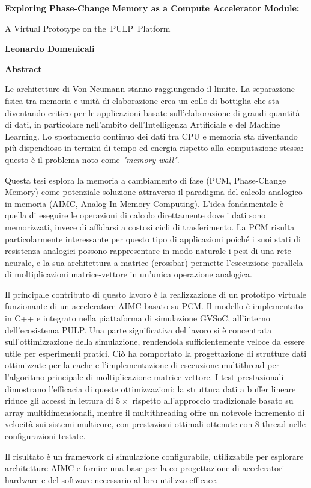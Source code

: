 \thispagestyle{plain}
\begin{center}
    \Large
    \textbf{Exploring Phase-Change Memory as a Compute Accelerator Module:}
        
    \vspace{0.4cm}
    \large
    A Virtual Prototype on the PULP Platform
        
    \vspace{0.4cm}
    \textbf{Leonardo Domenicali}
       
    \vspace{0.9cm}
    \textbf{Abstract}
\end{center}

Le architetture di Von Neumann stanno raggiungendo il limite.
La separazione fisica tra memoria e unità di elaborazione crea un collo di bottiglia che sta diventando critico per le applicazioni basate sull'elaborazione di grandi quantità di dati, in particolare nell'ambito dell'Intelligenza Artificiale e del Machine Learning.
Lo spostamento continuo dei dati tra CPU e memoria sta diventando più dispendioso in termini di tempo ed energia rispetto alla computazione stessa: questo è il problema noto come \textit{"memory wall"}.

Questa tesi esplora la memoria a cambiamento di fase (PCM, Phase-Change Memory) come potenziale soluzione attraverso il paradigma del calcolo analogico in memoria (AIMC, Analog In-Memory Computing).
L'idea fondamentale è quella di eseguire le operazioni di calcolo direttamente dove i dati sono memorizzati, invece di affidarsi a costosi cicli di trasferimento.
La PCM risulta particolarmente interessante per questo tipo di applicazioni poiché i suoi stati di resistenza analogici possono rappresentare in modo naturale i pesi di una rete neurale, e la sua architettura a matrice (crossbar) permette l'esecuzione parallela di moltiplicazioni matrice-vettore in un'unica operazione analogica.

Il principale contributo di questo lavoro è la realizzazione di un prototipo virtuale funzionante di un acceleratore AIMC basato su PCM.
Il modello è implementato in C++ e integrato nella piattaforma di simulazione GVSoC, all'interno dell'ecosistema PULP.
Una parte significativa del lavoro si è concentrata sull'ottimizzazione della simulazione, rendendola sufficientemente veloce da essere utile per esperimenti pratici.
Ciò ha comportato la progettazione di strutture dati ottimizzate per la cache e l'implementazione di esecuzione multithread per l'algoritmo principale di moltiplicazione matrice-vettore.
I test prestazionali dimostrano l'efficacia di queste ottimizzazioni: la struttura dati a buffer lineare riduce gli accessi in lettura di $5\times$ rispetto all'approccio tradizionale basato su array multidimensionali, mentre il multithreading offre un notevole incremento di velocità sui sistemi multicore, con prestazioni ottimali ottenute con 8 thread nelle configurazioni testate.

Il risultato è un framework di simulazione configurabile, utilizzabile per esplorare architetture AIMC e fornire una base per la co-progettazione di acceleratori hardware e del software necessario al loro utilizzo efficace.